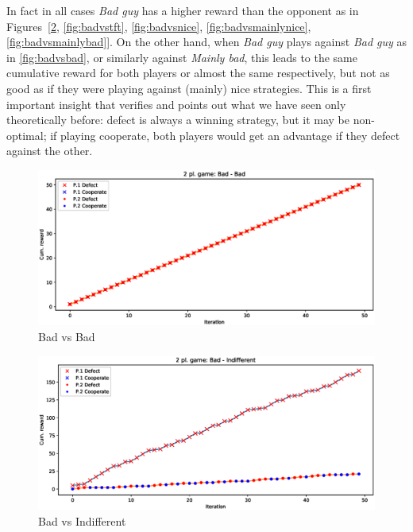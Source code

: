 \documentclass[journal,a4paper,10pt,twoside]{IEEEtran} %
\begin{document}
In fact in all cases \textit{Bad guy} has a higher reward than the opponent as in Figures~[\ref{fig:badvsindiff}, \ref{fig:badvstft}, \ref{fig:badvsnice}, \ref{fig:badvsmainlynice}, \ref{fig:badvsmainlybad}]. 
On the other hand, when \textit{Bad guy} plays against \textit{Bad guy} as in \autoref{fig:badvsbad}, or similarly against \textit{Mainly bad}, this leads to the same cumulative reward for both players or almost the same respectively, but not as good as if they were playing against (mainly) nice strategies. This is a first important insight that verifies and points out what we have seen only theoretically before: defect is always a winning strategy, but it may be non-optimal; if playing cooperate, both players would get an advantage if they defect against the other.

\begin{figure}[ht]
    \centering
    \includegraphics[width=1\columnwidth]{../img/ipd2p/ipd2p-rewards-Bad-Bad}
    \caption{Bad vs Bad}
    \label{fig:badvsbad}
\end{figure}

\begin{figure}[ht]
    \centering
    \includegraphics[width=1\columnwidth]{../img/ipd2p/ipd2p-rewards-Bad-Indifferent.eps}
    \caption{Bad vs Indifferent}
    \label{fig:badvsindiff}
\end{figure}
\end{document}
